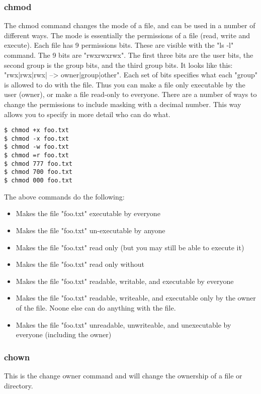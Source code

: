 \subsubsection{chmod} \mdseries
The chmod command changes the mode of a file, and can be used in a number of different ways.  The mode is essentially the permissions of a file (read, write and execute).  Each file has 9 permissions bits.  These are visible with the "ls -l" command.  The 9 bits are "rwxrwxrwx".  The first three bits are the user bits, the second group is the group bits, and the third group bits.  It looks like this: "rwx|rwx|rwx| --> owner|group|other".  Each set of bits specifies what each "group" is allowed to do with the file.  Thus you can make a file only executable by the user (owner), or make a file read-only to everyone.  There are a number of ways to change the permissions to include masking with a decimal number.  This way allows you to specify in more detail who can do what.

\begin{lstlisting}
$ chmod +x foo.txt
$ chmod -x foo.txt
$ chmod -w foo.txt
$ chmod =r foo.txt
$ chmod 777 foo.txt
$ chmod 700 foo.txt
$ chmod 000 foo.txt
\end{lstlisting}

The above commands do the following:
	\begin{itemize}
		\item Makes the file "foo.txt" executable by everyone
		\item Makes the file "foo.txt" un-executable by anyone
		\item Makes the file "foo.txt" read only (but you may still be able to execute it)
		\item Makes the file "foo.txt" read only without
		\item Makes the file "foo.txt" readable, writable, and executable by everyone
		\item Makes the file "foo.txt" readable, writeable, and executable only by the owner of the file.  Noone else can do anything with the file.
		\item Makes the file "foo.txt" unreadable, unwriteable, and unexecutable by everyone (including the owner)
	\end{itemize}
	
\subsubsection{chown} \mdseries
This is the change owner command and will change the ownership of a file or directory.  

